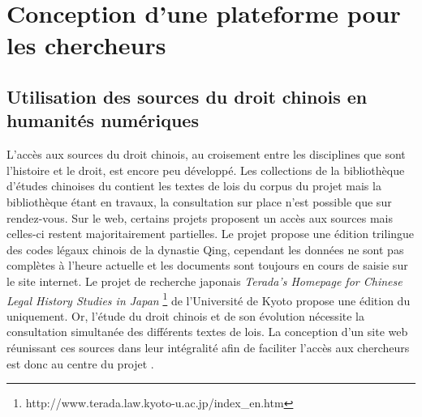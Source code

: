 \section{Conception d'une plateforme pour les chercheurs}
    \subsection{Utilisation des sources du droit chinois en humanités numériques}

L'accès aux sources du droit chinois, au croisement entre les disciplines que sont l'histoire et le droit, est encore peu développé. Les collections de la bibliothèque d'études chinoises du \cdf contient les textes de lois du corpus du projet mais la bibliothèque étant en travaux, la consultation sur place n'est possible que sur rendez-vous. Sur le web, certains projets proposent un accès aux sources mais celles-ci restent majoritairement partielles. Le projet \LSC  propose une édition trilingue des codes légaux chinois de la dynastie Qing, cependant les données ne sont pas complètes à l'heure actuelle et les documents sont toujours en cours de saisie sur le site internet. Le projet de recherche japonais \textit{Terada's Homepage for Chinese Legal History Studies in Japan} \footnote{http://www.terada.law.kyoto-u.ac.jp/index_en.htm} de l'Université de Kyoto propose une édition du \dc uniquement. Or, l'étude du droit chinois et de son évolution nécessite la consultation simultanée des différents textes de lois. La conception d'un site web réunissant ces sources dans leur intégralité afin de faciliter l'accès aux chercheurs est donc au centre du projet \COREL. 

